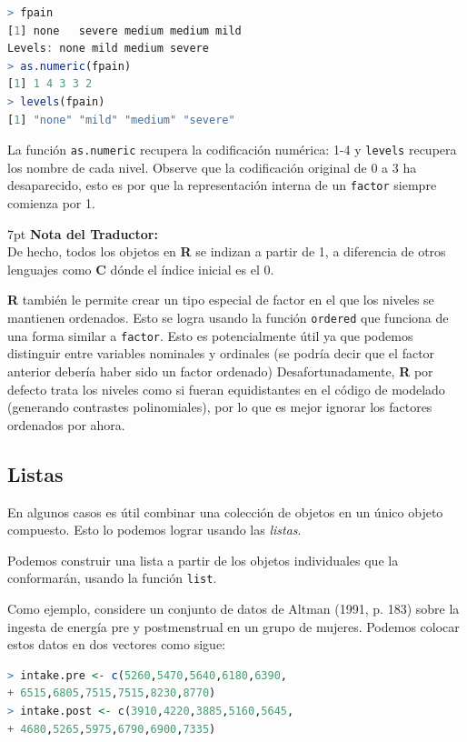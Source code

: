 \documentclass[spanish]{extbook}
\newenvironment{tradnote}{%
  \def\FrameCommand{%
    \hspace{1pt}%
    {\color{darkblue}\vrule width 2pt}%
    {\color{formalshade}\vrule width 4pt}%
    \colorbox{formalshade}%
  }%
  \vspace{12pt}
  \MakeFramed{\advance\hsize-\width\FrameRestore}%
  \noindent\hspace{-4.55pt}%
  \begin{adjustwidth}{}{7pt}%
  \vspace{1pt}%
  \textbf{Nota del Traductor:\\}%
}
{%
  \vspace{6pt}\end{adjustwidth}\endMakeFramed%
}
\numberwithin{equation}{section}
\numberwithin{figure}{section}
\begin{document}
\begin{lstlisting}[language=R]
> fpain
[1] none   severe medium medium mild  
Levels: none mild medium severe
> as.numeric(fpain)
[1] 1 4 3 3 2
> levels(fpain)
[1] "none" "mild" "medium" "severe"
\end{lstlisting}

La función \texttt{as.numeric} recupera la codificación numérica: 1-4 y
\texttt{levels} recupera los nombre de cada nivel. Observe que la codificación
original de 0 a 3 ha desaparecido, esto es por que la representación interna de
un \texttt{factor} siempre comienza por 1. 

\begin{tradnote} De hecho, todos los objetos en \textbf{R} se indizan a partir de 1, a
diferencia de otros lenguajes como \textbf{C} dónde el índice inicial es el
0.\end{tradnote}

\textbf{R} también le permite crear un tipo especial de factor en el que los
niveles se mantienen ordenados.  Esto se logra usando la función
\texttt{ordered} que funciona de una forma similar a \texttt{factor}.  Esto es
potencialmente útil ya que podemos distinguir entre variables nominales y
ordinales (se podría decir que el factor anterior debería haber sido un factor
ordenado) Desafortunadamente, \textbf{R} por defecto trata los niveles como si
fueran equidistantes en el código de modelado (generando contrastes
polinomiales), por lo que es mejor ignorar los factores ordenados por ahora.

\subsection{Listas} \label{listas}

En algunos casos es útil combinar una colección de objetos en un único objeto
compuesto. Esto lo podemos lograr usando las \textit{listas}. 

Podemos construir una lista a partir de los objetos individuales que la
conformarán, usando la función \texttt{list}.

Como ejemplo, considere un conjunto de datos de Altman (1991, p. 183) sobre la
ingesta de energía pre y postmenstrual en un grupo de mujeres. Podemos colocar
estos datos en dos vectores como sigue:

\begin{lstlisting}[language=R]
> intake.pre <- c(5260,5470,5640,6180,6390,
+ 6515,6805,7515,7515,8230,8770)
> intake.post <- c(3910,4220,3885,5160,5645,
+ 4680,5265,5975,6790,6900,7335)
\end{lstlisting}
\end{document}
